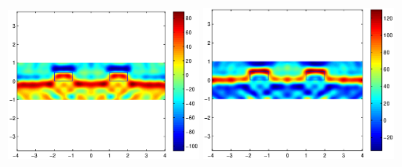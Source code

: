 \documentclass[12pt]{iopart}
\begin{document}
\begin{figure}
	\centering
	\includegraphics[width=0.45\textwidth]{./figure_rough/Bisq_multi}
	\includegraphics[width=0.45\textwidth]{./figure_rough/Bisq_multi_real}
	\caption{}\label{I1}
\end{figure}
\end{document}
